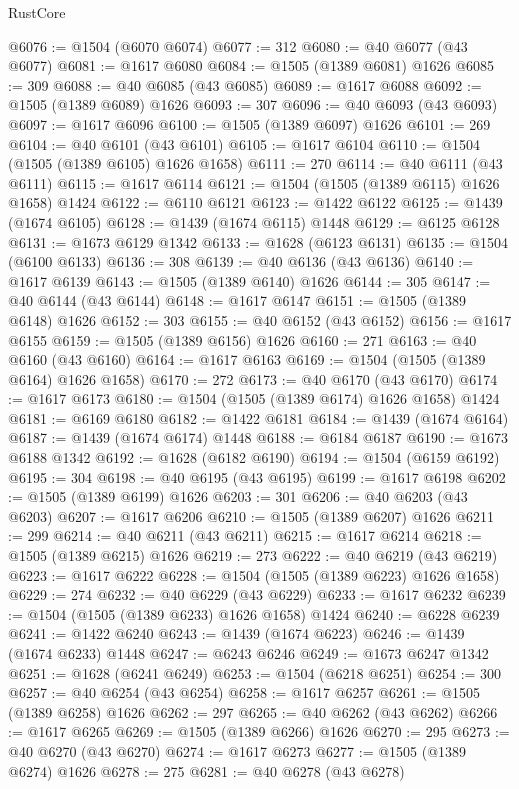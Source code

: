 \begin{lexlean}{RustCore}
\begin{coremodule}
@6076 := @1504 (@6070 @6074)
@6077 := 312
@6080 := @40 @6077 (@43 @6077)
@6081 := @1617 @6080
@6084 := @1505 (@1389 @6081) @1626
@6085 := 309
@6088 := @40 @6085 (@43 @6085)
@6089 := @1617 @6088
@6092 := @1505 (@1389 @6089) @1626
@6093 := 307
@6096 := @40 @6093 (@43 @6093)
@6097 := @1617 @6096
@6100 := @1505 (@1389 @6097) @1626
@6101 := 269
@6104 := @40 @6101 (@43 @6101)
@6105 := @1617 @6104
@6110 := @1504 (@1505 (@1389 @6105) @1626 @1658)
@6111 := 270
@6114 := @40 @6111 (@43 @6111)
@6115 := @1617 @6114
@6121 := @1504 (@1505 (@1389 @6115) @1626 @1658) @1424
@6122 := @6110 @6121
@6123 := @1422 @6122
@6125 := @1439 (@1674 @6105)
@6128 := @1439 (@1674 @6115) @1448
@6129 := @6125 @6128
@6131 := @1673 @6129 @1342
@6133 := @1628 (@6123 @6131)
@6135 := @1504 (@6100 @6133)
@6136 := 308
@6139 := @40 @6136 (@43 @6136)
@6140 := @1617 @6139
@6143 := @1505 (@1389 @6140) @1626
@6144 := 305
@6147 := @40 @6144 (@43 @6144)
@6148 := @1617 @6147
@6151 := @1505 (@1389 @6148) @1626
@6152 := 303
@6155 := @40 @6152 (@43 @6152)
@6156 := @1617 @6155
@6159 := @1505 (@1389 @6156) @1626
@6160 := 271
@6163 := @40 @6160 (@43 @6160)
@6164 := @1617 @6163
@6169 := @1504 (@1505 (@1389 @6164) @1626 @1658)
@6170 := 272
@6173 := @40 @6170 (@43 @6170)
@6174 := @1617 @6173
@6180 := @1504 (@1505 (@1389 @6174) @1626 @1658) @1424
@6181 := @6169 @6180
@6182 := @1422 @6181
@6184 := @1439 (@1674 @6164)
@6187 := @1439 (@1674 @6174) @1448
@6188 := @6184 @6187
@6190 := @1673 @6188 @1342
@6192 := @1628 (@6182 @6190)
@6194 := @1504 (@6159 @6192)
@6195 := 304
@6198 := @40 @6195 (@43 @6195)
@6199 := @1617 @6198
@6202 := @1505 (@1389 @6199) @1626
@6203 := 301
@6206 := @40 @6203 (@43 @6203)
@6207 := @1617 @6206
@6210 := @1505 (@1389 @6207) @1626
@6211 := 299
@6214 := @40 @6211 (@43 @6211)
@6215 := @1617 @6214
@6218 := @1505 (@1389 @6215) @1626
@6219 := 273
@6222 := @40 @6219 (@43 @6219)
@6223 := @1617 @6222
@6228 := @1504 (@1505 (@1389 @6223) @1626 @1658)
@6229 := 274
@6232 := @40 @6229 (@43 @6229)
@6233 := @1617 @6232
@6239 := @1504 (@1505 (@1389 @6233) @1626 @1658) @1424
@6240 := @6228 @6239
@6241 := @1422 @6240
@6243 := @1439 (@1674 @6223)
@6246 := @1439 (@1674 @6233) @1448
@6247 := @6243 @6246
@6249 := @1673 @6247 @1342
@6251 := @1628 (@6241 @6249)
@6253 := @1504 (@6218 @6251)
@6254 := 300
@6257 := @40 @6254 (@43 @6254)
@6258 := @1617 @6257
@6261 := @1505 (@1389 @6258) @1626
@6262 := 297
@6265 := @40 @6262 (@43 @6262)
@6266 := @1617 @6265
@6269 := @1505 (@1389 @6266) @1626
@6270 := 295
@6273 := @40 @6270 (@43 @6270)
@6274 := @1617 @6273
@6277 := @1505 (@1389 @6274) @1626
@6278 := 275
@6281 := @40 @6278 (@43 @6278)

\end{coremodule}
\end{lexlean}
